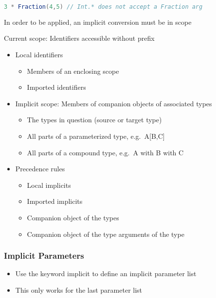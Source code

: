 \begin{lstlisting}[language=scala,mathescape=false]
3 * Fraction(4,5) // Int.* does not accept a Fraction arg
\end{lstlisting}

In order to be applied, an implicit conversion must be in scope

Current scope: Identifiers accessible without prefix

\begin{itemize}
\tightlist
\item
  Local identifiers

  \begin{itemize}
  \tightlist
  \item
    Members of an enclosing scope
  \item
    Imported identifiers
  \end{itemize}
\item
  Implicit scope: Members of companion objects of associated types

  \begin{itemize}
  \tightlist
  \item
    The types in question (source or target type)
  \item
    All parts of a parameterized type, e.g.~A{[}B,C{]}
  \item
    All parts of a compound type, e.g.~A with B with C
  \end{itemize}
\item
  Precedence rules

  \begin{itemize}
  \tightlist
  \item
    Local implicits
  \item
    Imported implicits
  \item
    Companion object of the types
  \item
    Companion object of the type arguments of the type
  \end{itemize}
\end{itemize}

\hypertarget{implicit-parameters}{%
\subsubsection{Implicit Parameters}\label{implicit-parameters}}

\begin{itemize}
\tightlist
\item
  Use the keyword implicit to define an implicit parameter list
\item
  This only works for the last parameter list
\end{itemize}

